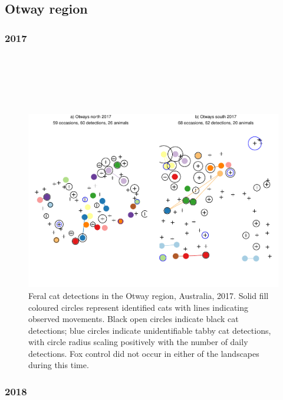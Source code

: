 \documentclass[11pt,a4paper,titlepage,twoside,openright]{style/unimelbthesis}
\begin{document}
\begin{mainmatter}
\hypertarget{otway-region}{%
\subsection{Otway region}\label{otway-region}}

\hypertarget{section}{%
\subsubsection{2017}\label{section}}

\(~\)

\(~\)

\(~\)
\begin{figure}

{\centering \includegraphics[width=1\linewidth]{figure/density-plot-ch-4-1} 

}

\caption{Feral cat detections in the Otway region, Australia, 2017. Solid fill coloured circles represent identified cats with lines indicating observed movements. Black open circles indicate black cat detections; blue circles indicate unidentifiable tabby cat detections, with circle radius scaling positively with the number of daily detections. Fox control did not occur in either of the landscapes during this time.}\label{fig:density-plot-ch-4}
\end{figure}
\newpage

\hypertarget{section-1}{%
\subsubsection{2018}\label{section-1}}

\(~\)


\end{mainmatter}
\end{document}
